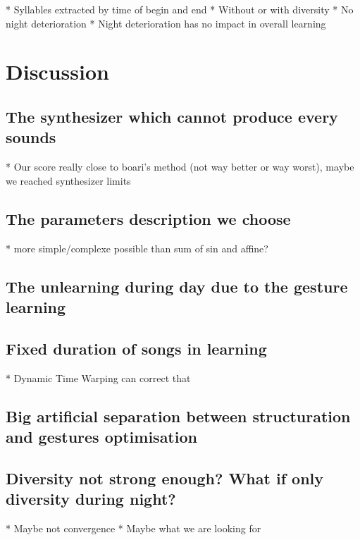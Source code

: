 \documentclass{report}
\begin{document}
  * Syllables extracted by time of begin and end
  * Without or with diversity
  * No night deterioration
  * Night deterioration has no impact in overall learning
\chapter{Discussion}\label{discussion}

\section{The synthesizer which cannot produce every
sounds}\label{the-synthesizer-which-cannot-produce-every-sounds}

  * Our score really close to boari's method (not way better or way
  worst), maybe we reached synthesizer limits
\section{The parameters description we
choose}\label{the-parameters-description-we-choose}

  * more simple/complexe possible than sum of sin and affine?
\section{The unlearning during day due to the gesture
learning}\label{the-unlearning-during-day-due-to-the-gesture-learning}

\section{Fixed duration of songs in
learning}\label{fixed-duration-of-songs-in-learning}

  * Dynamic Time Warping can correct that
\section{Big artificial separation between structuration and gestures
optimisation}\label{big-artificial-separation-between-structuration-and-gestures-optimisation}

\section{Diversity not strong enough? What if only diversity during
night?}\label{diversity-not-strong-enough-what-if-only-diversity-during-night}

  * Maybe not convergence
  * Maybe what we are looking for
\end{document}
